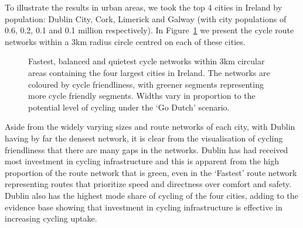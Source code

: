 \documentclass[
  super,
  preprint,
  3p]{elsarticle}
\begin{document}
To illustrate the results in urban areas, we took the top 4 cities in
Ireland by population: Dublin City, Cork, Limerick and Galway (with city
populations of 0.6, 0.2, 0.1 and 0.1 million respectively). In
Figure~\ref{fig-city-results} we present the cycle route networks within
a 3km radius circle centred on each of these cities.

\begin{figure}


\caption{\label{fig-city-results}Fastest, balanced and quietest cycle
networks within 3km circular areas containing the four largest cities in
Ireland. The networks are coloured by cycle friendliness, with greener
segments representing more cycle friendly segments. Widths vary in
proportion to the potential level of cycling under the `Go Dutch'
scenario.}

\end{figure}%

Aside from the widely varying sizes and route networks of each city,
with Dublin having by far the densest network, it is clear from the
visualisation of cycling friendliness that there are many gaps in the
networks. Dublin has had received most investment in cycling
infrastructure and this is apparent from the high proportion of the
route network that is green, even in the `Fastest' route network
representing routes that prioritize speed and directness over comfort
and safety. Dublin also has the highest mode share of cycling of the
four cities, adding to the evidence base showing that investment in
cycling infrastructure is effective in increasing cycling uptake.
\end{document}

